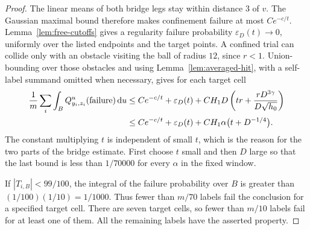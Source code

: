 \begin{proof}
The linear means of both bridge legs stay within distance $3$ of $v$.
The Gaussian maximal bound therefore makes confinement failure at
most $Ce^{-c/t}$.  Lemma~\ref{lem:free-cutoffs} gives a regularity
failure probability $\varepsilon_D(t)\to0$, uniformly over the listed
endpoints and the target points.  A confined trial can collide only
with an obstacle visiting the ball of radius $12$, since $r<1$.
Union-bounding over those obstacles and using
Lemma~\ref{lem:averaged-hit}, with a self-label summand
omitted when necessary, gives for each target cell
\begin{align}
 \frac1m\sum_i\int_B
 Q_{y_i,z_i}^{u}(\text{failure})\,\mathrm d u
 &\le Ce^{-c/t}+\varepsilon_D(t)
       +CH_1D\left(tr+\frac{rD^{3\gamma}}{D\sqrt{h_0}}\right)
 \notag\\
 &\le Ce^{-c/t}+\varepsilon_D(t)
       +CH_1\alpha\bigl(t+D^{-1/4}\bigr).
 \label{bridge:total-failure}
\end{align}
The constant multiplying $t$ is independent of small $t$, which is
the reason for the two parts of the bridge estimate.  First choose
$t$ small and then $D$ large so that the last bound is less than
$1/70000$ for every $\alpha$ in the fixed window.

If $|T_{i,B}|<99/100$, the integral of the failure probability over
$B$ is greater than $(1/100)(1/10)=1/1000$.  Thus fewer than
$m/70$ labels fail the conclusion for a specified target cell.
There are seven target cells, so fewer than $m/10$ labels fail for
at least one of them.  All the remaining labels have the asserted
property.
\end{proof}
